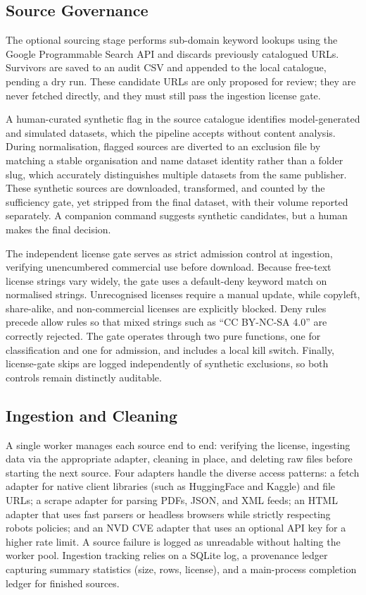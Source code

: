 \documentclass[conference]{IEEEtran}
\begin{document}
\subsection{Source Governance}

The optional sourcing stage performs sub-domain keyword lookups using the Google Programmable Search API and discards previously catalogued URLs. Survivors are saved to an audit CSV and appended to the local catalogue, pending a dry run. These candidate URLs are only proposed for review; they are never fetched directly, and they must still pass the ingestion license gate.

A human-curated synthetic flag in the source catalogue identifies model-generated and simulated datasets, which the pipeline accepts without content analysis. During normalisation, flagged sources are diverted to an exclusion file by matching a stable organisation and name dataset identity rather than a folder slug, which accurately distinguishes multiple datasets from the same publisher. These synthetic sources are downloaded, transformed, and counted by the sufficiency gate, yet stripped from the final dataset, with their volume reported separately. A companion command suggests synthetic candidates, but a human makes the final decision.

The independent license gate serves as strict admission control at ingestion, verifying unencumbered commercial use before download. Because free-text license strings vary widely, the gate uses a default-deny keyword match on normalised strings. Unrecognised licenses require a manual update, while copyleft, share-alike, and non-commercial licenses are explicitly blocked. Deny rules precede allow rules so that mixed strings such as ``CC BY-NC-SA 4.0'' are correctly rejected. The gate operates through two pure functions, one for classification and one for admission, and includes a local kill switch. Finally, license-gate skips are logged independently of synthetic exclusions, so both controls remain distinctly auditable.

\subsection{Ingestion and Cleaning}

A single worker manages each source end to end: verifying the license, ingesting data via the appropriate adapter, cleaning in place, and deleting raw files before starting the next source. Four adapters handle the diverse access patterns: a fetch adapter for native client libraries (such as HuggingFace and Kaggle) and file URLs; a scrape adapter for parsing PDFs, JSON, and XML feeds; an HTML adapter that uses fast parsers or headless browsers while strictly respecting robots policies; and an NVD CVE adapter that uses an optional API key for a higher rate limit. A source failure is logged as unreadable without halting the worker pool. Ingestion tracking relies on a SQLite log, a provenance ledger capturing summary statistics (size, rows, license), and a main-process completion ledger for finished sources.
\end{document}
